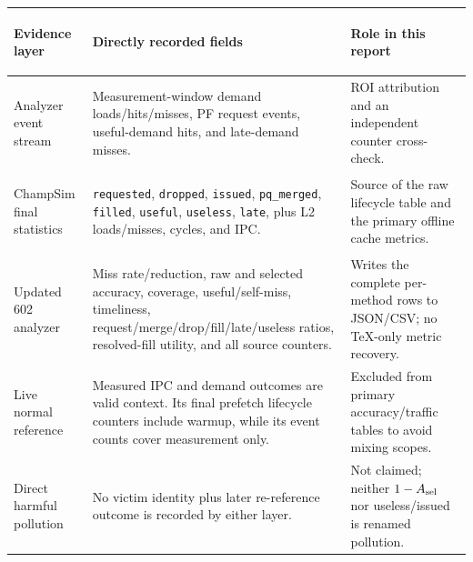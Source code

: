 \documentclass[10pt]{article}
\begin{document}
\begin{center}\scriptsize
{}
\end{center}

\begin{tabularx}{\textwidth}{@{}
  >{\bfseries\raggedright\arraybackslash}p{}
  >{\raggedright\arraybackslash}X
  >{\raggedright\arraybackslash}X@{}}
\toprule
Evidence layer & Directly recorded fields & Role in this report \\
\midrule
Analyzer event stream &
Measurement-window demand loads/hits/misses, PF request events,
useful-demand hits, and late-demand misses. &
ROI attribution and an independent counter cross-check.\\
ChampSim final statistics &
\texttt{requested}, \texttt{dropped}, \texttt{issued},
\texttt{pq\_merged}, \texttt{filled}, \texttt{useful},
\texttt{useless}, \texttt{late}, plus L2 loads/misses, cycles, and IPC. &
Source of the raw lifecycle table and the primary offline cache metrics.\\
Updated 602 analyzer &
Miss rate/reduction, raw and selected accuracy, coverage,
useful/self-miss, timeliness, request/merge/drop/fill/late/useless ratios,
resolved-fill utility, and all source counters. &
Writes the complete per-method rows to JSON/CSV; no TeX-only metric recovery.\\
Live normal reference &
Measured IPC and demand outcomes are valid context.  Its final prefetch
lifecycle counters include warmup, while its event counts cover measurement
only. &
Excluded from primary accuracy/traffic tables to avoid mixing scopes.\\
Direct harmful pollution &
No victim identity plus later re-reference outcome is recorded by either
layer. &
Not claimed; neither $1-A_{\rm sel}$ nor useless/issued is renamed pollution.\\
\bottomrule
\end{tabularx}
\end{document}
